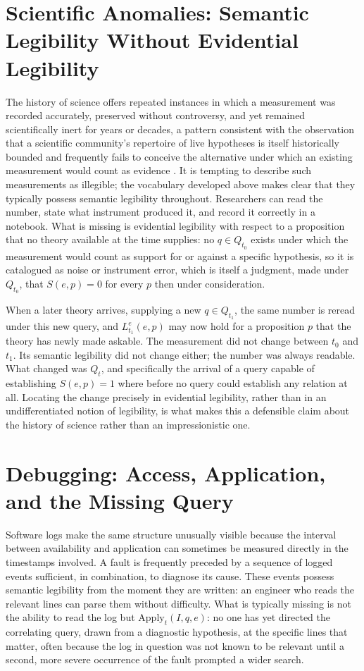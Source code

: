 \section{Scientific Anomalies: Semantic Legibility Without Evidential Legibility}

The history of science offers repeated instances in which a measurement was recorded accurately, preserved without controversy, and yet remained scientifically inert for years or decades, a pattern consistent with the observation that a scientific community's repertoire of live hypotheses is itself historically bounded and frequently fails to conceive the alternative under which an existing measurement would count as evidence \cite{stanford2006}. It is tempting to describe such measurements as illegible; the vocabulary developed above makes clear that they typically possess semantic legibility throughout. Researchers can read the number, state what instrument produced it, and record it correctly in a notebook. What is missing is evidential legibility with respect to a proposition that no theory available at the time supplies: no $q \in Q_{t_0}$ exists under which the measurement would count as support for or against a specific hypothesis, so it is catalogued as noise or instrument error, which is itself a judgment, made under $Q_{t_0}$, that $S(e,p)=0$ for every $p$ then under consideration.

When a later theory arrives, supplying a new $q \in Q_{t_1}$, the same number is reread under this new query, and $L^e_{t_1}(e,p)$ may now hold for a proposition $p$ that the theory has newly made askable. The measurement did not change between $t_0$ and $t_1$. Its semantic legibility did not change either; the number was always readable. What changed was $Q_t$, and specifically the arrival of a query capable of establishing $S(e,p)=1$ where before no query could establish any relation at all. Locating the change precisely in evidential legibility, rather than in an undifferentiated notion of legibility, is what makes this a defensible claim about the history of science rather than an impressionistic one.

\section{Debugging: Access, Application, and the Missing Query}

Software logs make the same structure unusually visible because the interval between availability and application can sometimes be measured directly in the timestamps involved. A fault is frequently preceded by a sequence of logged events sufficient, in combination, to diagnose its cause. These events possess semantic legibility from the moment they are written: an engineer who reads the relevant lines can parse them without difficulty. What is typically missing is not the ability to read the log but $\mathrm{Apply}_t(I,q,e)$: no one has yet directed the correlating query, drawn from a diagnostic hypothesis, at the specific lines that matter, often because the log in question was not known to be relevant until a second, more severe occurrence of the fault prompted a wider search.

